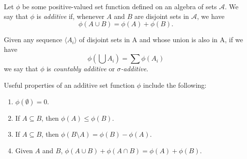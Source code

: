 \documentclass[12pt]{article}
\begin{document}
Let $\phi$ be some positive-valued set function defined on an algebra of sets $\mathcal{A}$.  We say that $\phi$ is \emph{additive} if, whenever $A$ and $B$ are disjoint sets in $\mathcal{A}$, we have
$$\phi(A \cup B) = \phi(A) + \phi(B) .$$

Given any sequence $\langle A_i \rangle$ of disjoint sets in A and whose union is also in A, if we have
$$\phi\left( \bigcup A_i \right) = \sum \phi(A_i)$$
we say that $\phi$ is \emph{countably additive} or \emph{$\sigma$-additive}.

Useful properties of an additive set function $\phi$ include the following:
\begin{enumerate}
\item $\phi(\emptyset) = 0$.
\item If $A \subseteq B$, then $\phi(A) \leq \phi(B)$.
\item If $A \subseteq B$, then $\phi(B \setminus A) = \phi(B) - \phi(A)$.
\item Given $A$ and $B$, $\phi(A \cup B) + \phi(A \cap B) = \phi(A) + \phi(B)$.  
\end{enumerate}
\end{document}
